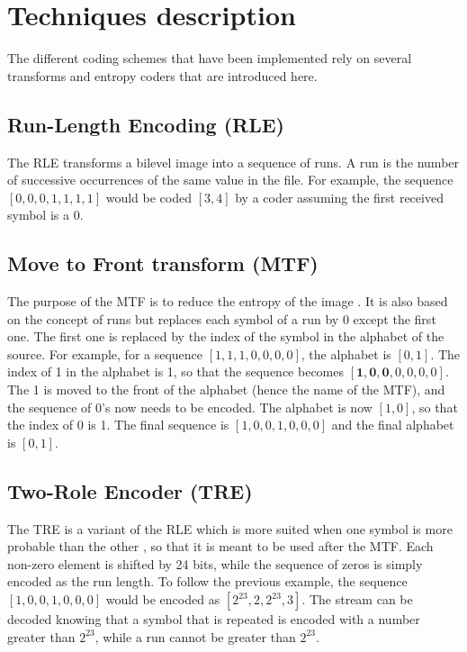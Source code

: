 \vspace*{-0.4cm}
\section{Techniques description}

The different coding schemes that have been implemented rely on several transforms and entropy coders that are introduced here.

\subsection{Run-Length Encoding (RLE)}

The RLE transforms a bilevel image into a sequence of runs. A run is the number of successive occurrences of the same value in the file. For example, the sequence $[0,0,0,1,1,1,1]$ would be coded $[3,4]$ by a coder assuming the first received symbol is a $0$.

\subsection{Move to Front transform (MTF)}

The purpose of the MTF is to reduce the entropy of the image \cite{benzid}. It is also based on the concept of runs but replaces each symbol of a run by 0 except the first one. The first one is replaced by the index of the symbol in the alphabet of the source. For example, for a sequence $[1,1,1,0,0,0,0]$, the alphabet is $[0,1]$. The index of 1 in the alphabet is 1, so that the sequence becomes $[\textbf{1},\textbf{0},\textbf{0},0,0,0,0]$. The 1 is moved to the front of the alphabet (hence the name of the MTF), and the sequence of 0's now needs to be encoded. The alphabet is now $[1,0]$, so that the index of 0 is 1. The final sequence is $[1,0,0,1,0,0,0]$ and the final alphabet is $[0,1]$.

\subsection{Two-Role Encoder (TRE)}

The TRE is a variant of the RLE which is more suited when one symbol is more probable than the other \cite{benzid}, so that it is meant to be used after the MTF. Each non-zero element is shifted by 24 bits, while the sequence of zeros is simply encoded as the run length. To follow the previous example, the sequence $[1,0,0,1,0,0,0]$ would be encoded as $[2^{23},2,2^{23},3]$. The stream can be decoded knowing that a symbol that is repeated is encoded with a number greater than $2^{23}$, while a run cannot be greater than $2^{23}$.

